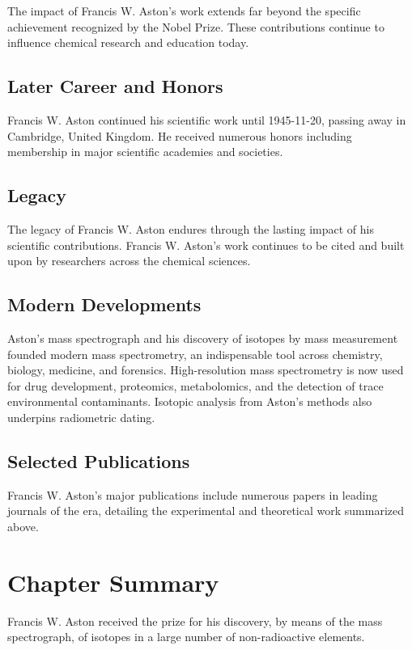The impact of Francis W. Aston's work extends far beyond the specific achievement recognized by the Nobel Prize.
These contributions continue to influence chemical research and education today.

\subsection*{Later Career and Honors}

Francis W. Aston continued his scientific work until 1945-11-20, passing away in Cambridge, United Kingdom.
He received numerous honors including membership in major scientific academies and societies.

\subsection*{Legacy}

The legacy of Francis W. Aston endures through the lasting impact of his scientific contributions.
Francis W. Aston's work continues to be cited and built upon by researchers across the chemical sciences.

\subsection*{Modern Developments}

Aston's mass spectrograph and his discovery of isotopes by mass measurement founded modern mass spectrometry, an indispensable tool across chemistry, biology, medicine, and forensics. High-resolution mass spectrometry is now used for drug development, proteomics, metabolomics, and the detection of trace environmental contaminants. Isotopic analysis from Aston's methods also underpins radiometric dating.

\subsection*{Selected Publications}

Francis W. Aston's major publications include numerous papers in leading journals of the era, detailing the experimental and theoretical work summarized above.

\clearpage

\section*{Chapter Summary}

Francis W. Aston received the prize for his discovery, by means of the mass spectrograph, of isotopes in a large number of non-radioactive elements.

